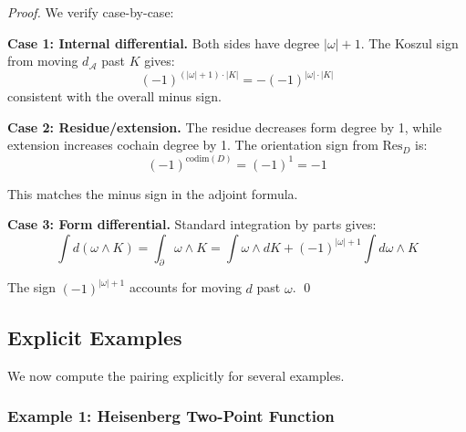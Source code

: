 \begin{proof}
We verify case-by-case:

\textbf{Case 1: Internal differential.}
Both sides have degree $|\omega| + 1$. The Koszul sign from moving $d_{\mathcal{A}}$ past
$K$ gives:
$$(-1)^{(|\omega|+1) \cdot |K|} = -(-1)^{|\omega| \cdot |K|}$$
consistent with the overall minus sign.

\textbf{Case 2: Residue/extension.}
The residue decreases form degree by 1, while extension increases cochain degree by 1.
The orientation sign from $\text{Res}_D$ is:
$$(-1)^{\text{codim}(D)} = (-1)^1 = -1$$

This matches the minus sign in the adjoint formula.

\textbf{Case 3: Form differential.}
Standard integration by parts gives:
$$\int d(\omega \wedge K) = \int_{\partial} \omega \wedge K = \int \omega \wedge dK + 
(-1)^{|\omega|+1} \int d\omega \wedge K$$

The sign $(-1)^{|\omega|+1}$ accounts for moving $d$ past $\omega$.
\qed
\end{proof}

\subsection{Explicit Examples}

We now compute the pairing explicitly for several examples.

\subsubsection{Example 1: Heisenberg Two-Point Function}

